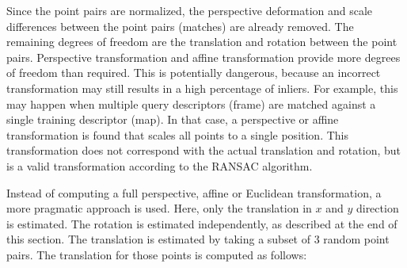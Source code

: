 Since the point pairs are normalized,
the perspective deformation and scale differences between the point pairs (matches) are already removed.
The remaining degrees of freedom are the translation and rotation between the point pairs. 
Perspective transformation and affine transformation provide more degrees of freedom than required.
This is potentially dangerous, because an incorrect transformation may still results in a high percentage of inliers.
For example, this may happen when multiple query descriptors (frame) are matched against a single training descriptor (map).
In that case, a perspective or affine transformation is found that scales all points to a single position.
This transformation does not correspond with the actual translation and rotation, but is a valid transformation according to the RANSAC algorithm.

Instead of computing a full perspective, affine or Euclidean transformation, a more pragmatic approach is used.
Here, only the translation in $x$ and $y$ direction is estimated.
The rotation is estimated independently, as described at the end of this section.
The translation is estimated by taking a subset of 3 random point pairs.
The translation for those points is computed as follows:

